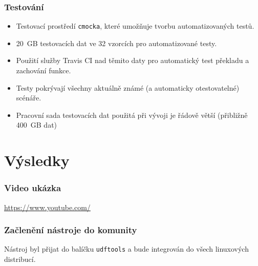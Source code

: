 \documentclass[aspectratio=169]{beamer}
\begin{document}
        \begin{frame}
            \frametitle{Testování}
            \vspace{40pt}
            \begin{itemize}
                \Large\item Testovací prostředí \texttt{cmocka}, které umožňuje tvorbu automatizovaných testů.
                \Large\item 20~GB testovacích dat ve 32 vzorcích pro automatizované testy.
                \Large\item Použití služby Travis CI nad těmito daty pro automatický test překladu a zachování funkce.
                \Large\item Testy pokrývají všechny aktuálně známé (a automaticky otestovatelné) scénáře.
                \Large\item Pracovní sada testovacích dat použitá při vývoji je řádově větší (přibližně 400~GB dat)
            \end{itemize}
        \end{frame}

    \section{Výsledky}
        \begin{frame}
            \frametitle{Video ukázka}
            \url{https://www.youtube.com/}
        \end{frame}
        \begin{frame}
            \frametitle{Začlenění nástroje do komunity}
            \vspace{40pt}
            \center
            \Huge 
            Nástroj byl přijat do balíčku \texttt{udftools} a bude integrován do všech linuxových distribucí.
        \end{frame}
\end{document}
